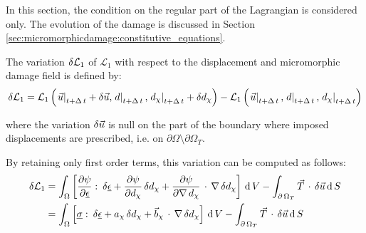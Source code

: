 In this section, the condition on the regular part of
the Lagrangian is considered only.
The evolution of the damage is discussed in Section
\ref{sec:micromorphicdamage:constitutive_equations}.

The variation \(\delta \mathcal{L}_{1}\) of $\mathcal{L}_{1}$ with respect to the
displacement and micromorphic damage field is defined by:
\begin{equation}
  \label{eq:ef_micromorphic:formulation:lagrangian_variation_0}
  \begin{aligned}
    \delta \mathcal{L}_{1}
    =
    \mathcal{L}_{1}\left(\left.\vec{u}\right|_{t+\Delta\,t}+\delta \vec{u},\left.d\right|_{t+\Delta\,t}, \left.d_{\chi}\right|_{t+\Delta\,t} + \delta d_{\chi}\right) - 
    \mathcal{L}_{1}\left(\left.\vec{u}\right|_{t+\Delta\,t},\left.d\right|_{t+\Delta\,t}, \left.d_{\chi}\right|_{t+\Delta\,t}\right)
  \end{aligned}
\end{equation}

where the variation \(\delta \vec{u}\) is null on the part of the
boundary where imposed displacements are prescribed, i.e. on
\(\partial\Omega\setminus\partial\Omega_{T}\).

By retaining only first order terms, this variation can be computed as follows:
\begin{equation}
  \label{eq:ef_micromorphic:formulation:lagrangian_variation_1}
  \begin{aligned}
    \delta \mathcal{L}_{1}&=
    \int_{\Omega}
    \left[
    \displaystyle \frac{\displaystyle \partial \psi}{\displaystyle \partial \underline{\epsilon}}\,\colon\,\delta \underline{\epsilon}+
    \displaystyle \frac{\displaystyle \partial \psi}{\displaystyle \partial d_{\chi}}\,\delta d_{\chi}+
    \displaystyle \frac{\displaystyle \partial \psi}{\displaystyle \partial \nabla\,d_{\chi}}\,\cdot\,\nabla\,\delta d_{\chi}
    \right]
    \,\mathrm{d}\,V -
    \int_{\partial\,\Omega_{T}} \vec{T}\,\cdot\,\delta \vec{u} \,\mathrm{d}\,S \\
    &=
    \int_{\Omega}
    \left[
    \underline{\sigma}\,\colon\,\delta \underline{\epsilon}+
    a_{\chi}\,\delta d_{\chi}+
    \vec{b}_{\chi}\,\cdot\,\nabla\,\delta d_{\chi}
    \right]
    \,\mathrm{d}\,V -
    \int_{\partial\,\Omega_{T}} \vec{T}\,\cdot\,\delta \vec{u} \,\mathrm{d}\,S \\
  \end{aligned}
\end{equation}

